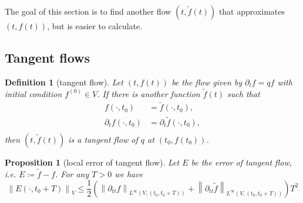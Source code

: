 \documentclass{article}
\newtheorem{prop}{Proposition}
\newtheorem{defi}{Definition}
\numberwithin{equation}{section}
\begin{document}
The goal of this section is to find another flow $(t,\widetilde{f}(t))$ that approximates $(t,f(t))$, but is easier to calculate.

\subsection{Tangent flows}


\begin{defi}[tangent flow]
    Let $(t, f(t))$ be the flow given by $\partial_{t} f = qf$ with initial condition $f^{(0)} \in V$. 
    If there is another function $\widetilde{f}(t)$ such that
    \begin{equation*}
        \begin{split}
            f(\cdot, t_{0}) &= \widetilde{f}(\cdot, t_{0}),\\
            \partial_{t} f(\cdot, t_{0}) &= \partial_{t}\widetilde{f}(\cdot, t_{0}),\\
        \end{split}
    \end{equation*}
    then $(t,\widetilde{f}(t))$ is a tangent flow of $q$ at $(t_{0},f(t_{0}))$.
\end{defi}

\begin{prop}[local error of tangent flow]\label{prop:error_tangent}
    Let $E$ be the error of tangent flow, i.e. $E \coloneqq \widetilde{f} - f$. For any $T > 0$ we have
    \begin{equation}\label{eq:tangent_error}
        \left\lVert E(\cdot, t_{0} + T)\right\rVert_{V} \leq \frac{1}{2} \left( \left\lVert \partial_{tt} f\right\rVert_{L^{\infty}(V,(t_{0}, t_{0} + T))} + \left\lVert \partial_{tt} \widetilde{f} \right\rVert_{L^{\infty}(V,(t_{0}, t_{0} + T))} \right) T^{2}
    \end{equation}
\end{prop}
\end{document}
